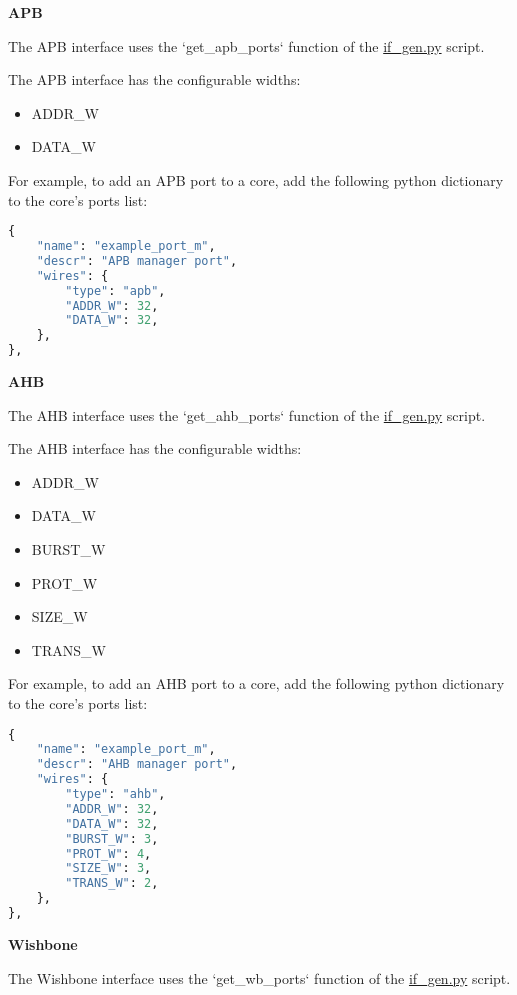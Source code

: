 %
%
\clearpage
\large\textbf{APB}

The APB interface uses the `get\_apb\_ports` function of the \href{https://github.com/IObundle/py2hwsw/blob/main/py2hwsw/scripts/if_gen.py}{if\_gen.py} script.


The APB interface has the configurable widths:
\begin{itemize}
  \item ADDR\_W
  \item DATA\_W
\end{itemize}

For example, to add an APB port to a core, add the following python dictionary to the core's ports list:
\begin{lstlisting}[language=python]
{
	"name": "example_port_m",
	"descr": "APB manager port",
	"wires": {
		"type": "apb",
		"ADDR_W": 32,
		"DATA_W": 32,
	},
},
\end{lstlisting}


%
%
\clearpage
\large\textbf{AHB}

The AHB interface uses the `get\_ahb\_ports` function of the \href{https://github.com/IObundle/py2hwsw/blob/main/py2hwsw/scripts/if_gen.py}{if\_gen.py} script.


The AHB interface has the configurable widths:
\begin{itemize}
  \item ADDR\_W
  \item DATA\_W
  \item BURST\_W
  \item PROT\_W
  \item SIZE\_W
  \item TRANS\_W
\end{itemize}

For example, to add an AHB port to a core, add the following python dictionary to the core's ports list:
\begin{lstlisting}[language=python]
{
	"name": "example_port_m",
	"descr": "AHB manager port",
	"wires": {
		"type": "ahb",
		"ADDR_W": 32,
		"DATA_W": 32,
		"BURST_W": 3,
		"PROT_W": 4,
		"SIZE_W": 3,
		"TRANS_W": 2,
	},
},
\end{lstlisting}


%
%
\clearpage
\large\textbf{Wishbone}

The Wishbone interface uses the `get\_wb\_ports` function of the \href{https://github.com/IObundle/py2hwsw/blob/main/py2hwsw/scripts/if_gen.py}{if\_gen.py} script.

